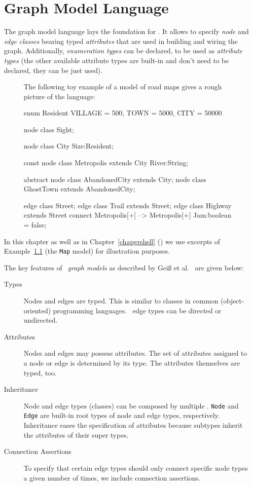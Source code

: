 \chapter{Graph Model Language}
\label{chapmodellang}
The graph model language lays the foundation for \GrG.
It allows to specify \emph{node} and \emph{edge classes} bearing typed \emph{attributes} that are used in building and wiring the graph. 
Additionally, \emph{enumeration types} can be declared, to be used as \emph{attribute types} (the other available attribute types are built-in and don't need to be declared, they can be just used).

\begin{figure}[htbp]
\begin{example}\label{ex:model:map}
The following toy example of a model of road maps gives a rough picture of the language:
\begin{grgen}
enum Resident {VILLAGE = 500, TOWN = 5000, CITY = 50000}

node class Sight;

node class City {
  Size:Resident;
}

const node class Metropolis extends City {
  River:String;
}

abstract node class AbandonedCity extends City;
node class GhostTown extends AbandonedCity;

edge class Street;
edge class Trail extends Street;
edge class Highway extends Street
    connect Metropolis[+] --> Metropolis[+]
{
    Jam:boolean = false;
}
\end{grgen}
\end{example}
\end{figure}

In this chapter as well as in Chapter~\ref{chapgrshell} (\GrShell) we use excerpts of Example~\ref{ex:model:map} (the \texttt{Map} model) for illustration purposes.


The key features of \GrG\ \emph{graph models} as described by Geiß et al.~\cite{GBGHS:06,KG:07} are given below:

\begin{description}
\item[Types] Nodes and edges are typed.
  This is similar to classes in common (object-oriented) programming languages. \GrG\ edge types can be directed or undirected.
\item[Attributes] Nodes and edges may possess attributes. The set of attributes assigned to a node or edge is determined by its type. The attributes themselves are typed, too.
\item[Inheritance] Node and edge types (classes) can be composed by multiple . \texttt{Node} and \texttt{Edge} are built-in root types of node and edge types, respectively. Inheritance eases the specification of attributes because subtypes inherit the attributes of their super types. 
\item[Connection Assertions] To specify that certain edge types should only connect specific node types a given number of times, we include connection assertions.
\end{description}

